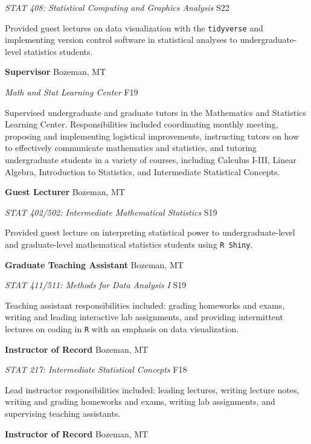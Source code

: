 \documentclass[a4paper]{article}
\begin{document}
\emph{STAT 408: Statistical Computing and Graphics Analysis} \hfill S22

Provided guest lectures on data visualization with the
\texttt{tidyverse} and implementing version control software in
statistical analyses to undergraduate-level statistics students.
\vspace*{2mm}

\textbf{Supervisor} \hfill Bozeman, MT

\emph{Math and Stat Learning Center} \hfill F19

Supervised undergraduate and graduate tutors in the Mathematics and
Statistics Learning Center. Responsibilities included coordinating
monthly meeting, proposing and implementing logistical improvements,
instructing tutors on how to effectively communicate mathematics and
statistics, and tutoring undergraduate students in a variety of courses,
including Calculus I-III, Linear Algebra, Introduction to Statistics,
and Intermediate Statistical Concepts.\vspace*{2mm}

\textbf{Guest Lecturer} \hfill Bozeman, MT

\emph{STAT 402/502: Intermediate Mathematical Statistics} \hfill S19

Provided guest lecture on interpreting statistical power to
undergraduate-level and graduate-level mathematical statistics students
using \texttt{R\ Shiny}. \vspace*{2mm}

\textbf{Graduate Teaching Assistant} \hfill Bozeman, MT

\emph{STAT 411/511: Methods for Data Analysis I} \hfill S19

Teaching assistant responsibilities included: grading homeworks and
exams, writing and leading interactive lab assignments, and providing
intermittent lectures on coding in \texttt{R} with an emphasis on data
visualization. \vspace*{2mm}

\textbf{Instructor of Record} \hfill Bozeman, MT

\emph{STAT 217: Intermediate Statistical Concepts} \hfill F18

Lead instructor responsibilities included: leading lectures, writing
lecture notes, writing and grading homeworks and exams, writing lab
assignments, and supervising teaching assistants. \vspace*{2mm}

\textbf{Instructor of Record} \hfill Bozeman, MT
\end{document}
